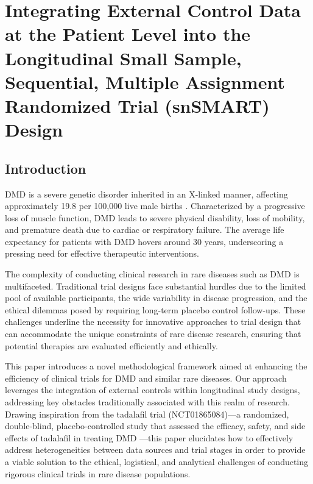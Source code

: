 \chapter{Integrating External Control Data at the Patient Level into the Longitudinal Small Sample, Sequential, Multiple Assignment Randomized Trial (snSMART) Design}
\label{chpt:chpt4}

\section{Introduction}
\label{sec:intro}
\ac{DMD} is a severe genetic disorder inherited in an X-linked manner, affecting approximately 19.8 per 100,000 live male births \citep{crisafulli2020global}. Characterized by a progressive loss of muscle function, \ac{DMD} leads to severe physical disability, loss of mobility, and premature death due to cardiac or respiratory failure. The average life expectancy for patients with \ac{DMD} hovers around 30 years, underscoring a pressing need for effective therapeutic interventions.

The complexity of conducting clinical research in rare diseases such as \ac{DMD} is multifaceted. Traditional trial designs face substantial hurdles due to the limited pool of available participants, the wide variability in disease progression, and the ethical dilemmas posed by requiring long-term placebo control follow-ups. These challenges underline the necessity for innovative approaches to trial design that can accommodate the unique constraints of rare disease research, ensuring that potential therapies are evaluated efficiently and ethically.

This paper introduces a novel methodological framework aimed at enhancing the efficiency of clinical trials for \ac{DMD} and similar rare diseases. Our approach leverages the integration of external controls within longitudinal study designs, addressing key obstacles traditionally associated with this realm of research. Drawing inspiration from the tadalafil trial (NCT01865084)—a randomized, double-blind, placebo-controlled study that assessed the efficacy, safety, and side effects of tadalafil in treating \ac{DMD} —this paper elucidates how to effectively address heterogeneities between data sources and trial stages in order to provide a viable solution to the ethical, logistical, and analytical challenges of conducting rigorous clinical trials in rare disease populations.

